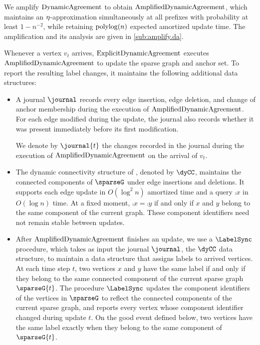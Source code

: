 We amplify $ \mathrm{DynamicAgreement} $ to obtain $ \mathrm{AmplifiedDynamicAgreement} $, which maintains an $ \eta $-approximation simultaneously at all prefixes with probability at least $ 1-n^{-2} $, while retaining $ \operatorname{polylog}(n) $ expected amortized update time.
The amplification and its analysis are given in \cref{sub:amplify.da}.

Whenever a vertex $ v_t $ arrives, $ \mathrm{ExplicitDynamicAgreement} $ executes $ \mathrm{AmplifiedDynamicAgreement} $ to update the sparse graph and anchor set.
To report the resulting label changes, it maintains the following additional data structures:
\begin{itemize}
    \item A journal $ \journal $ records every edge insertion, edge deletion, and change of anchor membership during the execution of $ \mathrm{AmplifiedDynamicAgreement} $.
    For each edge modified during the update, the journal also records whether it was present immediately before its first modification.

    We denote by $ \journal{t} $ the changes recorded in the journal during the execution of $ \mathrm{AmplifiedDynamicAgreement} $ on the arrival of $ v_t $.

    \item The dynamic connectivity structure of \cite{holm2001poly}, denoted by $ \dyCC $, maintains the connected components of $ \sparseG $ under edge insertions and deletions.
    It supports each edge update in $ O(\log^2 n) $ amortized time and a query $ \comp{x} $ in $ O(\log n) $ time.
    At a fixed moment, $ \comp{x}=\comp{y} $ if and only if $ x $ and $ y $ belong to the same component of the current graph.
    These component identifiers need not remain stable between updates.

    \item After $ \mathrm{AmplifiedDynamicAgreement} $ finishes an update, we use a $ \LabelSync $ procedure, which takes as input the journal $ \journal $, the $ \dyCC $ data structure, to maintain a data structure that assigns labels to arrived vertices.
        At each time step $ t $, two vertices $ x $ and $ y $ have the same label if and only if they belong to the same connected component of the current sparse graph $ \sparseG{t} $.
        The procedure $ \LabelSync $ updates the component identifiers of the vertices in $ \sparseG $ to reflect the connected components of the current sparse graph, and reports every vertex whose component identifier changed during update $ t $.
    On the good event defined below, two vertices have the same label exactly when they belong to the same component of $ \sparseG{t} $.
\end{itemize}


